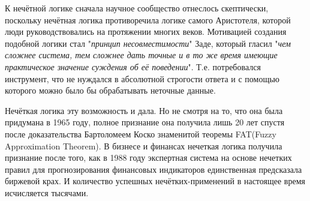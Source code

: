 \documentclass[18pt, a4paper]{extarticle}
\begin{document}
\begin{center}
\end{center}

К нечётной логике сначала научное сообщество отнеслось скептически, поскольку нечётная логика противоречила логике самого Аристотеля, которой люди руководствовались на протяжении многих веков. Мотивацией создания подобной логики стал "\textit{принцип несовместимости}"{} Заде, который гласил "\textit{чем сложнее система, тем сложнее дать точные и в то же время имеющие практическое значение суждения об её поведении}"{}. Т.е. потребовался инструмент, что не нуждался в абсолютной строгости ответа и с помощью которого можно было бы обрабатывать неточные данные.

Нечёткая логика эту возможность и дала. Но не смотря на то, что она была придумана в 1965 году, полное признание она получила лишь 20 лет спустя после доказательства Бартоломеем Коско знаменитой теоремы FAT(Fuzzy Approximation Theorem). В бизнесе и финансах нечеткая логика получила признание после того, как в 1988 году экспертная система на основе нечетких правил для прогнозирования финансовых индикаторов единственная предсказала биржевой крах. И количество успешных нечётких-применений в настоящее время исчисляется тысячами.
\end{document}
